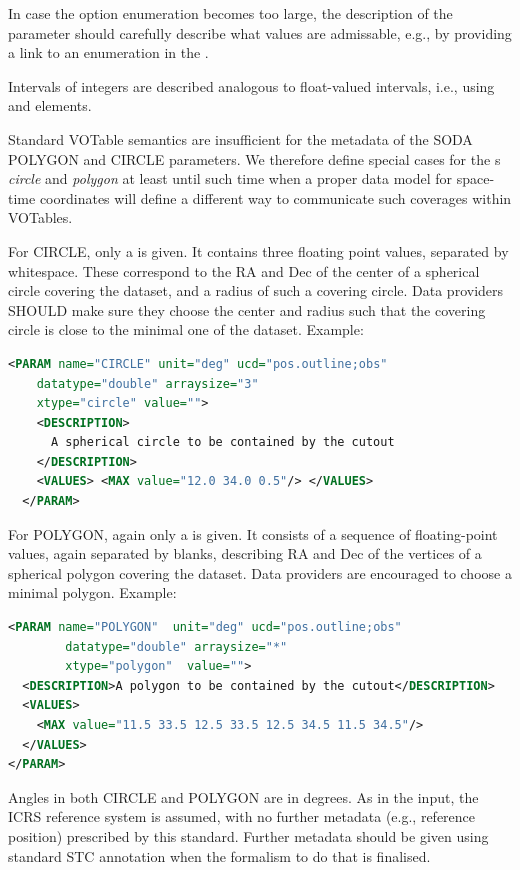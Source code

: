 \documentclass[11pt,a4paper]{ivoa}
\begin{document}
In case the option enumeration becomes too large, the description
of the parameter should carefully describe what values are
admissable, e.g., by providing a link to an enumeration in the
.

Intervals of integers are described analogous to float-valued
intervals, i.e., using  and  elements.

Standard VOTable semantics are insufficient for the metadata of the SODA
POLYGON and CIRCLE parameters.  We therefore define special cases for
the s \emph{circle} and \emph{polygon} at least until such
time when a proper data model for space-time coordinates will define a
different way to communicate such coverages within VOTables.

For CIRCLE, only a  is given. It contains three
floating point values, separated by whitespace.  These correspond
to the RA and Dec of the center of a spherical circle covering the
dataset, and a radius of such a covering circle.  Data providers
SHOULD make sure they choose the center and radius such that the
covering circle is close to the minimal one of the dataset.
Example:

\begin{lstlisting}[language=XML]
  <PARAM name="CIRCLE" unit="deg" ucd="pos.outline;obs"
    datatype="double" arraysize="3"
    xtype="circle" value="">
    <DESCRIPTION>
      A spherical circle to be contained by the cutout
    </DESCRIPTION>
    <VALUES> <MAX value="12.0 34.0 0.5"/> </VALUES>
  </PARAM>
\end{lstlisting}

For POLYGON, again only a  is given.  It consists of
a sequence of floating-point values, again separated by blanks,
describing RA and Dec of the vertices of a spherical polygon
covering the dataset.  Data providers are encouraged to choose a
minimal polygon.  Example:

\begin{lstlisting}[language=XML]
<PARAM name="POLYGON"  unit="deg" ucd="pos.outline;obs"
        datatype="double" arraysize="*"
        xtype="polygon"  value="">
  <DESCRIPTION>A polygon to be contained by the cutout</DESCRIPTION>
  <VALUES>
    <MAX value="11.5 33.5 12.5 33.5 12.5 34.5 11.5 34.5"/>
  </VALUES>
</PARAM>
\end{lstlisting}

Angles in both CIRCLE and POLYGON are in degrees.  As in the input,
the ICRS reference system is assumed, with no further metadata (e.g.,
reference position) prescribed by this standard.  Further metadata 
should be given using standard STC annotation when the formalism to do
that is finalised.
\end{document}
